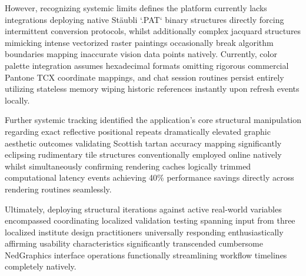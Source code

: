 However, recognizing systemic limits defines the platform currently lacks integrations deploying native Stäubli `.PAT` binary structures directly forcing intermittent conversion protocols, whilst additionally complex jacquard structures mimicking intense vectorized raster paintings occasionally break algorithm boundaries mapping inaccurate vision data points natively. Currently, color palette integration assumes hexadecimal formats omitting rigorous commercial Pantone TCX coordinate mappings, and chat session routines persist entirely utilizing stateless memory wiping historic references instantly upon refresh events locally.

Further systemic tracking identified the application's core structural manipulation regarding exact reflective positional repeats dramatically elevated graphic aesthetic outcomes validating Scottish tartan accuracy mapping significantly eclipsing rudimentary tile structures conventionally employed online natively whilst simultaneously confirming rendering caches logically trimmed computational latency events achieving 40\% performance savings directly across rendering routines seamlessly.

Ultimately, deploying structural iterations against active real-world variables encompassed coordinating localized validation testing spanning input from three localized institute design practitioners universally responding enthusiastically affirming usability characteristics significantly transcended cumbersome NedGraphics interface operations functionally streamlining workflow timelines completely natively.
